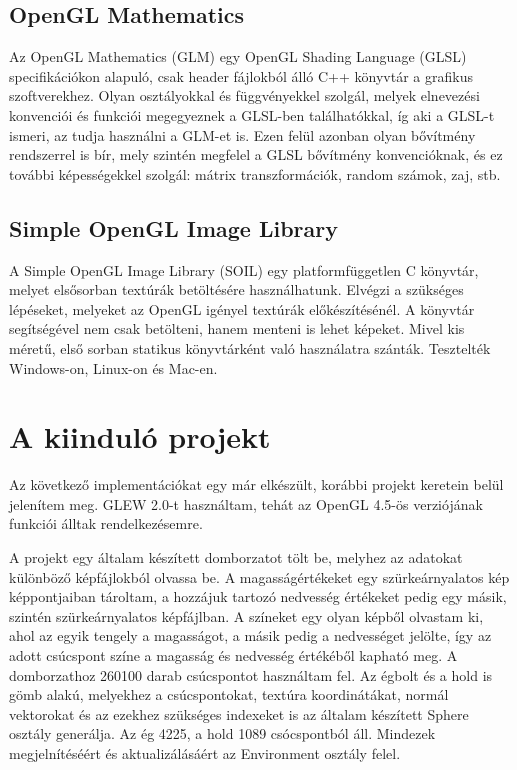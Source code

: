 \subsection{OpenGL Mathematics}
Az OpenGL Mathematics (GLM) egy OpenGL Shading Language (GLSL) specifikációkon alapuló, csak header fájlokból álló C++ könyvtár a grafikus szoftverekhez. Olyan osztályokkal és függvényekkel szolgál, melyek elnevezési konvenciói és funkciói megegyeznek a GLSL-ben találhatókkal, íg aki a GLSL-t ismeri, az tudja használni a GLM-et is. Ezen felül azonban olyan bővítmény rendszerrel is bír, mely szintén megfelel a GLSL bővítmény konvencióknak, és ez további képességekkel szolgál: mátrix transzformációk, random számok, zaj, stb.

\subsection{Simple OpenGL Image Library}
A Simple OpenGL Image Library (SOIL) egy platformfüggetlen C könyvtár, melyet elsősorban textúrák betöltésére használhatunk. Elvégzi a szükséges lépéseket, melyeket az OpenGL igényel textúrák előkészítésénél. A könyvtár segítségével nem csak betölteni, hanem menteni is lehet képeket. Mivel kis méretű, első sorban statikus könyvtárként való használatra szánták. Tesztelték Windows-on, Linux-on és Mac-en. 

\section{A kiinduló projekt}

Az következő implementációkat egy már elkészült, korábbi projekt keretein belül jelenítem meg. GLEW 2.0-t használtam, tehát az OpenGL 4.5-ös verziójának funkciói álltak rendelkezésemre. 

A projekt egy általam készített domborzatot tölt be, melyhez az adatokat különböző képfájlokból olvassa be. A magasságértékeket egy szürkeárnyalatos kép képpontjaiban tároltam, a hozzájuk tartozó nedvesség értékeket pedig egy másik, szintén szürkeárnyalatos képfájlban. A színeket egy olyan képből olvastam ki, ahol az egyik tengely a magasságot, a másik pedig a nedvességet jelölte, így az adott csúcspont színe a magasság és nedvesség értékéből kapható meg. A domborzathoz 260100 darab csúcspontot használtam fel. Az égbolt és a hold is gömb alakú, melyekhez a csúcspontokat, textúra koordinátákat, normál vektorokat és az ezekhez szükséges indexeket is az általam készített Sphere osztály generálja. Az ég 4225, a hold 1089 csócspontból áll. Mindezek megjelnítéséért és aktualizálásáért az Environment osztály felel.

